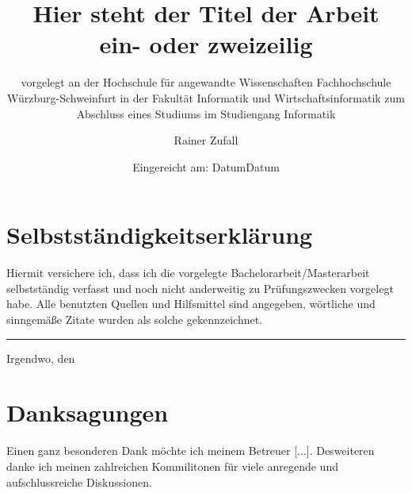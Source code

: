 \documentclass[12pt,a4paper,DIV13,pdftex,BCOR10mm,fleqn,liststotoc,bibtotoc,cleardoubleempty]{scrbook}
\begin{document}
\frontmatter
\titlehead{%
  {Hochschule f\"{u}r angewandte Wissenschaften\\
   Fachhochschule W\"{u}rzburg-Schweinfurt\\
   Fakult\"{a}t Informatik und Wirtschaftsinformatik}}
\subject{Bachelorarbeit}
\title{Hier steht der Titel der Arbeit\\ ein- oder zweizeilig\\[10mm]}
\subtitle{\normalsize{vorgelegt an der Hochschule f\"{u}r angewandte Wissenschaften Fachhochschule W\"{u}rzburg-Schweinfurt in der Fakult\"{a}t Informatik und Wirtschaftsinformatik zum Abschluss eines Studiums im Studiengang Informatik}}
\author{Rainer Zufall}
\date{\normalsize{Eingereicht am: Datum}}
\publishers{
  \normalsize{Erstpr\"{u}fer: Prof. } \\
  \normalsize{Zweitpr\"{u}fer: Prof. }\\
}


\maketitle

\thispagestyle{empty}
\section*{Selbstst\"{a}ndigkeitserkl\"{a}rung}
Hiermit versichere ich, dass ich die vorgelegte Bachelorarbeit/Masterarbeit selbstst\"{a}ndig verfasst und noch nicht anderweitig zu Pr\"{u}fungszwecken vorgelegt habe. Alle benutzten Quellen und Hilfsmittel sind angegeben, w\"{o}rtliche und sinngem\"{a}{\ss}e Zitate wurden als solche gekennzeichnet.\\[15mm]
\vspace{20mm}
\hrule
\vspace{5mm}
Irgendwo, den \date{Datum}

\vspace{5cm}
\section*{Danksagungen}
Einen ganz besonderen Dank m\"{o}chte ich meinem Betreuer [...]. Desweiteren danke ich meinen zahlreichen Kommilitonen f\"{u}r viele anregende und aufschlussreiche Diskussionen.
\end{document}
